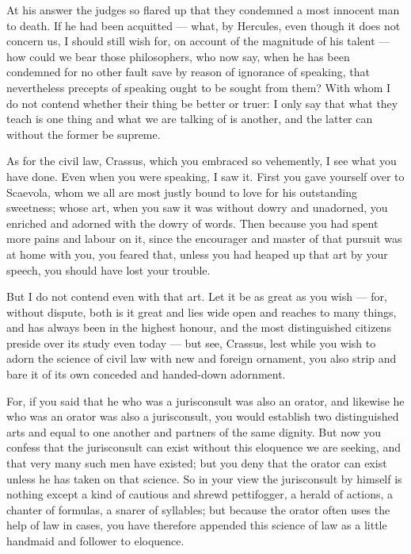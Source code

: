  At his answer the judges so flared up that they condemned a most innocent man to death. If he had been acquitted — what, by Hercules, even though it does not concern us, I should still wish for, on account of the magnitude of his talent — how could we bear those philosophers, who now say, when he has been condemned for no other fault save by reason of ignorance of speaking, that nevertheless precepts of speaking ought to be sought from them? With whom I do not contend whether their thing be better or truer: I only say that what they teach is one thing and what we are talking of is another, and the latter can without the former be supreme.

 As for the civil law, Crassus, which you embraced so vehemently, I see what you have done. Even when you were speaking, I saw it. First you gave yourself over to Scaevola, whom we all are most justly bound to love for his outstanding sweetness; whose art, when you saw it was without dowry and unadorned, you enriched and adorned with the dowry of words. Then because you had spent more pains and labour on it, since the encourager and master of that pursuit was at home with you, you feared that, unless you had heaped up that art by your speech, you should have lost your trouble.

 But I do not contend even with that art. Let it be as great as you wish — for, without dispute, both is it great and lies wide open and reaches to many things, and has always been in the highest honour, and the most distinguished citizens preside over its study even today — but see, Crassus, lest while you wish to adorn the science of civil law with new and foreign ornament, you also strip and bare it of its own conceded and handed-down adornment.

 For, if you said that he who was a jurisconsult was also an orator, and likewise he who was an orator was also a jurisconsult, you would establish two distinguished arts and equal to one another and partners of the same dignity. But now you confess that the jurisconsult can exist without this eloquence we are seeking, and that very many such men have existed; but you deny that the orator can exist unless he has taken on that science. So in your view the jurisconsult by himself is nothing except a kind of cautious and shrewd pettifogger, a herald of actions, a chanter of formulas, a snarer of syllables; but because the orator often uses the help of law in cases, you have therefore appended this science of law as a little handmaid and follower to eloquence.

